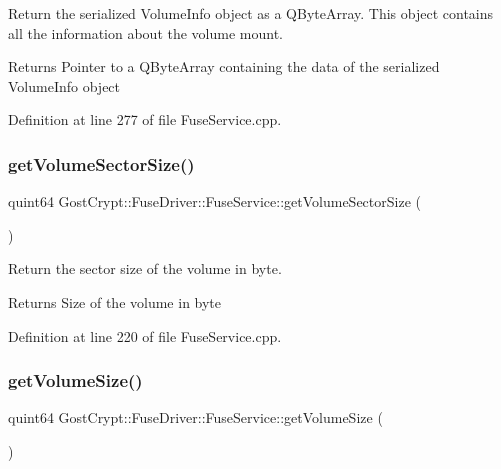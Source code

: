 Return the serialized Volume\+Info object as a Q\+Byte\+Array. This object contains all the information about the volume mount. 

\begin{DoxyReturn}{Returns}
Pointer to a Q\+Byte\+Array containing the data of the serialized Volume\+Info object 
\end{DoxyReturn}


Definition at line 277 of file Fuse\+Service.\+cpp.

\mbox{\label{class_gost_crypt_1_1_fuse_driver_1_1_fuse_service_a71cd668462d167ba83f04f2218ba7292}} 
\subsubsection{\texorpdfstring{get\+Volume\+Sector\+Size()}{getVolumeSectorSize()}}
{\footnotesize\ttfamily quint64 Gost\+Crypt\+::\+Fuse\+Driver\+::\+Fuse\+Service\+::get\+Volume\+Sector\+Size (\begin{DoxyParamCaption}{ }\end{DoxyParamCaption})\hspace{0.3cm}{\ttfamily [static]}}



Return the sector size of the volume in byte. 

\begin{DoxyReturn}{Returns}
Size of the volume in byte 
\end{DoxyReturn}


Definition at line 220 of file Fuse\+Service.\+cpp.

\mbox{\label{class_gost_crypt_1_1_fuse_driver_1_1_fuse_service_a7220db84a173f86716e34df4115b85c1}} 
\subsubsection{\texorpdfstring{get\+Volume\+Size()}{getVolumeSize()}}
{\footnotesize\ttfamily quint64 Gost\+Crypt\+::\+Fuse\+Driver\+::\+Fuse\+Service\+::get\+Volume\+Size (\begin{DoxyParamCaption}{ }\end{DoxyParamCaption})\hspace{0.3cm}{\ttfamily [static]}}



